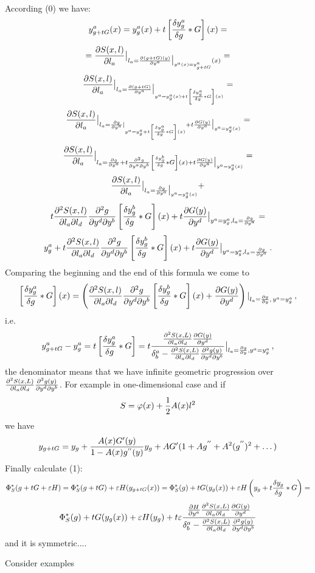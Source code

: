 According (0) we have:
        $$
      y^a_{g+t G}(x)=y^a_g(x)+
   t\left[
  {\delta y^a_g\over \delta g}* G
        \right]
          (x)=
        $$
        $$
={\partial S(x,l)\over \partial l_a}\big\vert_
  {l_a={\partial (g+t G)(y)\over \partial y^a}
     \big\vert_{y^a(x)=y^a_{g+ tG}}(x)}
        =
        $$
        $$
{\partial S(x,l)\over \partial l_a}\big\vert_
  {l_a={\partial (g+t G)\over \partial y^a}
      \big\vert_{y^a=y^a_g(x)+
   t\left[
  {\delta y^a_g\over \delta g}* G
     \right]
      (x)
      }}=
      $$
       $$
{\partial S(x,l)\over \partial l_a}\big\vert_
  {l_a={\partial g\over \partial y^a}\vert_{y^a=y^a_g+
   t\left[
  {\delta y^a_g\over \delta g}* G
     \right](x)}+
       t{\partial G(y)\over \partial y^a}
   \big\vert_{y^a=y^a_g(x)}}=
       $$
       $$
{\partial S(x,l)\over \partial l_a}\big\vert_
  {l_a={\partial g\over \partial y^a}
         +
   t{\partial^2 g\over \partial y^a \partial y^b}
               \left[
{\delta y^b_g\over \delta g}* G
                \right](x)
           +t{\partial G(y)\over \partial y^a}
   \big\vert_{y^a=y^a_g(x)}}=
       $$
        $$
{\partial S(x,l)\over \partial l_a}\big\vert_
  {l_a={\partial g\over \partial y^a}
        \big\vert_{y^a=y^a_g(x)}
        }
        +
           $$
           $$
            t
 {\partial^2 S(x,l)\over \partial l_a \partial l_d}
   {\partial^2 g\over \partial y^d \partial y^b}
\left[
{\delta y^b_g\over \delta g}* G
\right](x)
   +t{\partial G(y)\over \partial y^d}
   \big\vert_{y^a=y^a_g
  ,l_a={\partial g\over \partial y^a}}=
       $$
        $$
         y^a_g+
            t
 {\partial^2 S(x,l)\over \partial l_a \partial l_d}
   {\partial^2 g\over \partial y^d \partial y^b}
\left[
{\delta y^b_g\over \delta g}* G
\right](x)
    +t{\partial G(y)\over \partial y^d}
   \big\vert_{y^a=y^a_g,
    l_a={\partial g\over \partial y^a}}\,.
       $$
Comparing the beginning and the end of 
this formula we come to
       $$
    \left[
 {\delta y^a_g\over \delta g}* G
\right](x)=
       \left(
  {\partial^2 S(x,l)\over \partial l_a \partial l_d}
   {\partial^2 g\over \partial y^d \partial y^b}
\left[
{\delta y^b_g\over \delta g}* G
\right](x)+{\partial G(y)\over \partial y^d}
       \right)
   \vert_{l_a={\partial g\over \partial y},\,
       y^a=y^a_g}\,, 
        $$
i.e.
          $$
 y^a_{g+tG}-y^a_g=         
    t\left[
 {\delta y^a_g\over \delta g}* G
      \right]=
                    t{ 
  {\partial^2 S(x,L)\over \partial l_a \partial l_d}
          {\partial G(y)\over \partial y^d}
         \over
   \delta^a_b-
  {\partial^2 S(x,L)\over \partial l_a \partial l_d}
      {\partial^2 g(y)\over \partial y^d \partial y^b}
        }\big\vert_{l_a={\partial g\over \partial y},
      y^a=y^a_g}\,,
         $$
the denominator means that 
we have infinite geometric progression
over $
  {\partial^2 S(x,L)\over \partial l_a \partial l_d}
      {\partial^2 g(y)\over \partial y^d \partial y^b}$. For example
in one-dimensional case and if 
       $$
       S=\varphi(x)+{1\over 2}A(x)l^2
       $$
we have
        $$
   y_{g+t G}=y_g+{A(x)G'(y)\over 1-A(x)g^{''}(y)}
       y_g+AG'(1+Ag^{''}+A^2(g^{''})^2+\dots)
            $$
Finally calculate (1):
       $$
\Phi^*_S(g+tG+{\varepsilon} H)=\Phi^*_S(g+tG)+
    {\varepsilon} H(y_{g+tG}(x))=
\Phi^*_S(g)+t G(y_g(x))+{\varepsilon} H
                \left(
               y_g+
   t{\delta y_g\over \delta g}*G
              \right)=
             $$
              $$
\Phi^*_S(g)+t G(y_g(x))+{\varepsilon} H(y_g)+
       t{\varepsilon}{
      {\partial H\over \partial y^a} 
  {\partial^2 S(x,L)\over \partial l_a \partial l_d}
          {\partial G(y)\over \partial y^d}
         \over
   \delta^a_b-
  {\partial^2 S(x,L)\over \partial l_a \partial l_d}
      {\partial^2 g(y)\over \partial y^d \partial y^b}
        }
              $$
and it is symmetric....



Consider examples


\bye
